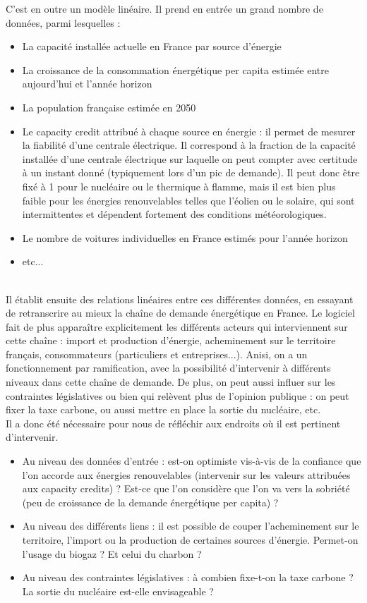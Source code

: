 \documentclass{article}
\theoremstyle{nopointbreak}
\theoremstyle{nobrkbold}
\begin{document}
 C'est en outre un modèle linéaire. Il prend en entrée un grand nombre de données, parmi lesquelles :
 \begin{itemize}
 \item La capacité installée actuelle en France par source d'énergie
 \item La croissance de la consommation énergétique per capita estimée entre aujourd'hui et l'année horizon
 \item La population française estimée en 2050
 \item Le capacity credit attribué à chaque source en énergie : il permet de mesurer la fiabilité d'une centrale électrique. Il correspond à la fraction de la capacité installée d'une centrale électrique sur laquelle on peut compter avec certitude à un instant donné (typiquement lors d'un pic de demande). Il peut donc être fixé à 1 pour le nucléaire ou le thermique à flamme, mais il est bien plus faible pour les énergies renouvelables telles que l'éolien ou le solaire, qui sont intermittentes et dépendent fortement des conditions météorologiques.
 \item Le nombre de voitures individuelles en France estimés pour l'année horizon
 \item etc...
 \end{itemize}
\\

Il établit ensuite des relations linéaires entre ces différentes données, en essayant de retranscrire au mieux la chaîne de demande énergétique en France. Le logiciel fait de plus apparaître explicitement les différents acteurs qui interviennent sur cette chaîne : import et production d'énergie, acheminement sur le territoire français, consommateurs (particuliers et entreprises...). Anisi, on a un fonctionnement par ramification, avec la possibilité d'intervenir à différents niveaux dans cette chaîne de demande. De plus, on peut aussi influer sur les contraintes législatives ou bien qui relèvent plus de l'opinion publique : on peut fixer la taxe carbone, ou aussi mettre en place la sortie du nucléaire, etc.\\

Il a donc été nécessaire pour nous de réfléchir aux endroits où il est pertinent d'intervenir.
 \begin{itemize}
 \item Au niveau des données d'entrée : est-on optimiste vis-à-vis de la confiance que l'on accorde aux énergies renouvelables (intervenir sur les valeurs attribuées aux capacity credits) ? Est-ce que l'on considère que l'on va vers la sobriété (peu de croissance de la demande énergétique per capita) ?
 \item Au niveau des différents liens : il est possible de couper l'acheminement sur le territoire, l'import ou la production de certaines sources d'énergie. Permet-on l'usage du biogaz ? Et celui du charbon ?
 \item Au niveau des contraintes législatives : à combien fixe-t-on la taxe carbone ? La sortie du nucléaire est-elle envisageable ?
 \end{itemize}
 
\end{document}
